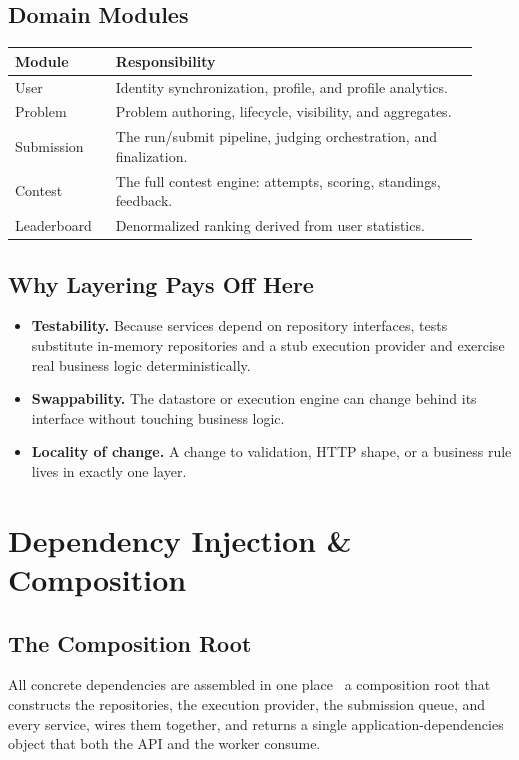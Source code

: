 \documentclass[12pt,a4paper,oneside]{report}
\begin{document}
\section{Domain Modules}
\begin{longtable}{@{}p{0.20\linewidth} p{0.72\linewidth}@{}}
\toprule
\textbf{Module} & \textbf{Responsibility}\\
\midrule
\endhead
User & Identity synchronization, profile, and profile analytics.\\
Problem & Problem authoring, lifecycle, visibility, and aggregates.\\
Submission & The run/submit pipeline, judging orchestration, and finalization.\\
Contest & The full contest engine: attempts, scoring, standings, feedback.\\
Leaderboard & Denormalized ranking derived from user statistics.\\
\bottomrule
\end{longtable}

\section{Why Layering Pays Off Here}
\begin{itemize}[leftmargin=1.5em]
  \item \textbf{Testability.} Because services depend on repository interfaces,
        tests substitute in-memory repositories and a stub execution provider and
        exercise real business logic deterministically.
  \item \textbf{Swappability.} The datastore or execution engine can change
        behind its interface without touching business logic.
  \item \textbf{Locality of change.} A change to validation, HTTP shape, or a
        business rule lives in exactly one layer.
\end{itemize}

\chapter{Dependency Injection \& Composition}
\section{The Composition Root}
All concrete dependencies are assembled in one place \textemdash\ a composition
root that constructs the repositories, the execution provider, the submission
queue, and every service, wires them together, and returns a single
application-dependencies object that both the API and the worker consume.
\end{document}
